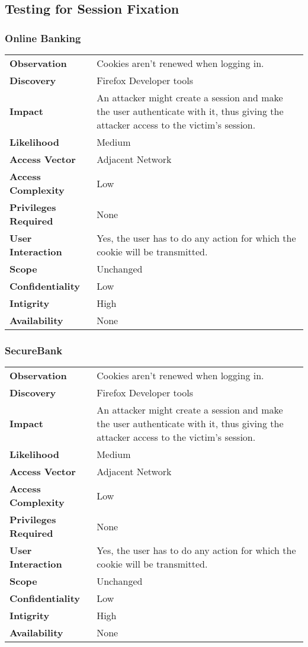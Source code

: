 \subsection{Testing for Session Fixation}

\subsubsection*{Online Banking}

\begin{tabular}{l|p{10cm}}
\textbf{Observation} & Cookies aren't renewed when logging in. \\
\textbf{Discovery} & Firefox Developer tools \\
\textbf{Impact} & An attacker might create a session and make the user authenticate with it, thus giving the attacker access to the victim's session. \\
\textbf{Likelihood} & Medium \\
\textbf{Access Vector} & Adjacent Network \\
\textbf{Access Complexity} & Low\\
\textbf{Privileges Required} & None \\
\textbf{User Interaction} & Yes, the user has to do any action for which the cookie will be transmitted. \\
\textbf{Scope} & Unchanged \\
\textbf{Confidentiality} & Low \\
\textbf{Intigrity} & High\\
\textbf{Availability} & None \\
\end{tabular}

\subsubsection*{SecureBank}

\begin{tabular}{l|p{10cm}}
\textbf{Observation} & Cookies aren't renewed when logging in. \\
\textbf{Discovery} & Firefox Developer tools \\
\textbf{Impact} & An attacker might create a session and make the user authenticate with it, thus giving the attacker access to the victim's session. \\
\textbf{Likelihood} & Medium \\
\textbf{Access Vector} & Adjacent Network \\
\textbf{Access Complexity} & Low\\
\textbf{Privileges Required} & None \\
\textbf{User Interaction} & Yes, the user has to do any action for which the cookie will be transmitted. \\
\textbf{Scope} & Unchanged \\
\textbf{Confidentiality} & Low \\
\textbf{Intigrity} & High\\
\textbf{Availability} & None \\
\end{tabular}

